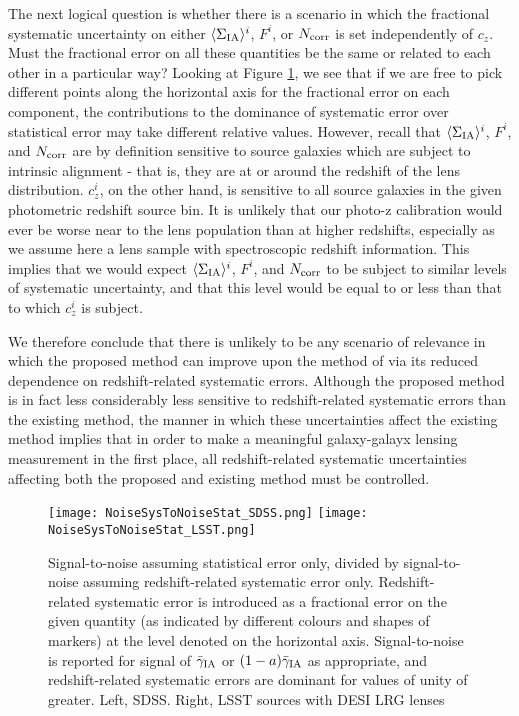 \documentclass[a4paper,fleqn,usenatbib]{mnras}
\begin{document}
The next logical question is whether there is a scenario in which the fractional systematic uncertainty on either $\langle \Sigma_{\rm IA} \rangle^i$, $F^i$, or $N_{\rm corr}$ is set independently of $c_z$. Must the fractional error on all these quantities be the same or related to each other in a particular way? Looking at Figure \ref{fig:StoNsysvstat}, we see that if we are free to pick different points along the horizontal axis for the fractional error on each component, the contributions to the dominance of systematic error over statistical error may take different relative values. However, recall that $\langle \Sigma_{\rm IA} \rangle^i$, $F^i$, and $N_{\rm corr}$ are by definition sensitive to source galaxies which are subject to intrinsic alignment  - that is, they are at or around the redshift of the lens distribution. $c_z^i$, on the other hand, is sensitive to all source galaxies in the given photometric redshift source bin. It is unlikely that our photo-z calibration would ever be worse near to the lens population than at higher redshifts, especially as we assume here a lens sample with spectroscopic redshift information. This implies that we would expect $\langle \Sigma_{\rm IA} \rangle^i$, $F^i$, and $N_{\rm corr}$ to be subject to similar levels of systematic uncertainty, and that this level would be equal to or less than that to which $c_z^i$ is subject. 

We therefore conclude that there is unlikely to be any scenario of relevance in which the proposed method can improve upon the method of \cite{Blazek2012} via its reduced dependence on redshift-related systematic errors. Although the proposed method is in fact less considerably less sensitive to redshift-related systematic errors than the existing method, the manner in which these uncertainties affect the existing method implies that in order to make a meaningful galaxy-galayx lensing measurement in the first place, all redshift-related systematic uncertainties affecting both the proposed and existing method must be controlled.

\begin{figure*}
\centering
\texttt{[image: NoiseSysToNoiseStat\_SDSS.png]}
\texttt{[image: NoiseSysToNoiseStat\_LSST.png]}
\caption{Signal-to-noise assuming statistical error only, divided by signal-to-noise assuming redshift-related systematic error only. Redshift-related systematic error is introduced as a fractional error on the given quantity (as indicated by different colours and shapes of markers) at the level denoted on the horizontal axis. Signal-to-noise is reported for signal of $\bar{\gamma}_{\rm IA}$ or $(1-a)\bar{\gamma}_{\rm IA}$ as appropriate, and redshift-related systematic errors are dominant for values of unity of greater. Left, SDSS. Right, LSST sources with DESI LRG lenses}
\label{fig:StoNsysvstat}
\end{figure*}
\end{document}
